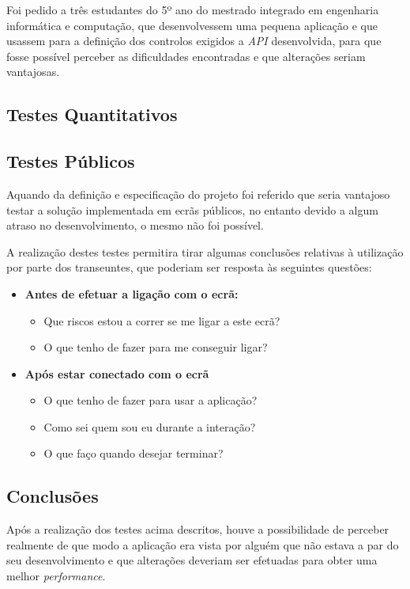 	Foi pedido a três estudantes do 5º ano do mestrado integrado em engenharia informática e computação, que desenvolvessem uma pequena aplicação e que usassem para a definição dos controlos exigidos a \textit{API} desenvolvida, para que fosse possível perceber as dificuldades encontradas e que alterações seriam vantajosas.   

\subsection*{Testes Quantitativos}

	

\subsection*{Testes Públicos}

	Aquando da definição e especificação do projeto foi referido que seria vantajoso testar a solução implementada em ecrãs públicos, no entanto devido a algum atraso no desenvolvimento, o mesmo não foi possível.

	A realização destes testes permitira tirar algumas conclusões relativas à utilização por parte dos transeuntes, que poderiam ser resposta às seguintes questões:

	\begin{itemize}
	\item \textbf{Antes de efetuar a ligação com o ecrã:}
		\begin{itemize}
		\item Que riscos estou a correr se me ligar a este ecrã?
		\item O que tenho de fazer para me conseguir ligar?
		\end{itemize}
	\item \textbf{Após estar conectado com o ecrã}
		\begin{itemize}
		\item O que tenho de fazer para usar a aplicação?
		\item Como sei quem sou eu durante a interação?
		\item O que faço quando desejar terminar?
		\end{itemize}
	\end{itemize} 

\subsection*{Conclusões}

	Após a realização dos testes acima descritos, houve a possibilidade de perceber realmente de que modo a aplicação era vista por alguém que não estava a par do seu desenvolvimento e que alterações deveriam ser efetuadas para obter uma melhor \textit{performance}.

